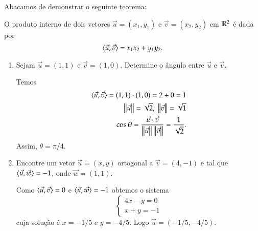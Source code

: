 Abacamos de demonstrar o seguinte teorema:
\begin{teorema}
  O produto interno de dois vetores $\vec{u} = (x_1, y_1)$ e $\vec{v} = (x_2, y_2)$ em $\mathbb{R}^2$ \'e dada por
  \[
    \langle \vec{u}, \vec{v} \rangle = x_1x_2 + y_1y_2.
  \]
\end{teorema}

\begin{exemplos}
  \begin{enumerate}
    \item Sejam $\vec{u} = (1, 1)$ e $\vec{v} = (1,0)$. Determine o \^angulo entre $\vec{u}$ e $\vec{v}$.
    \begin{solucao}
      Temos
      \begin{align*}
        \langle \vec{u}, \vec{v} \rangle = (1, 1)\cdot(1,0) = 2 + 0 = 1\\
        \left\Vert{\vec{u}}\right\Vert = \sqrt{2},\ \left\Vert{\vec{v}}\right\Vert = \sqrt{1}\\
        \cos\theta = \frac{\vec{u}\cdot\vec{v}}{\left\Vert{\vec{u}}\right\Vert\left\Vert{\vec{v}}\right\Vert} = \dfrac{1}{\sqrt{2}}.
      \end{align*}
      Assim, $\theta = \pi/4$.
    \end{solucao}
    \item Encontre um vetor $\vec{u} = (x, y)$ ortogonal a $\vec{v} = (4, -1)$ e tal que $\langle \vec{u}, \vec{w} \rangle = -1$, onde $\vec{w} = (1,1)$.
    \begin{solucao}
      Como $\langle \vec{u}, \vec{v} \rangle = 0$ e $\langle \vec{u}, \vec{w} \rangle = -1$ obtemos o sistema
      \[
        \begin{cases}
          4x - y = 0\\
          x + y = -1
        \end{cases}
      \]
      cuja solu\c{c}\~ao \'e $x = -1/5$ e $y = -4/5$. Logo $\vec{u} = (-1/5, -4/5)$.
    \end{solucao}
  \end{enumerate}
\end{exemplos}

